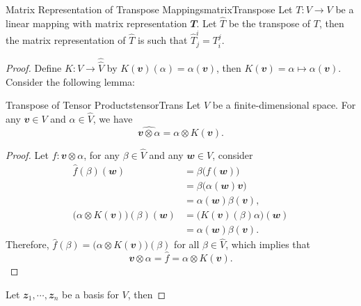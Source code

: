 \documentclass[math, code]{amznotes}
\theoremstyle{remark}
\begin{document}
\begin{probox}{Matrix Representation of Transpose Mappings}{matrixTranspose}
    Let $T \colon V \to V$ be a linear mapping with matrix representation $\mathbfit{T}$. Let $\widehat{T}$ be the transpose of $T$, then the matrix representation of $\widehat{T}$ is such that $\widehat{T}^{i}_j = T^j_i$.
    \tcblower
    \begin{proof}
        Define $K \colon V \to \widehat{\widehat{V}}$ by $K(\mathbfit{v})(\alpha) = \alpha(\mathbfit{v})$, then $K(\mathbfit{v}) = \alpha \mapsto \alpha(\mathbfit{v})$. Consider the following lemma:
        \begin{lembox}{Transpose of Tensor Products}{tensorTrans}
            Let $V$ be a finite-dimensional space. For any $\mathbfit{v} \in V$ and $\alpha \in \widehat{V}$, we have 
            \begin{equation*}
                \widehat{\mathbfit{v} \otimes \alpha} = \alpha \otimes K(\mathbfit{v}).
            \end{equation*}
            \tcblower
            \begin{proof}
                Let $f \colon \mathbfit{v} \otimes \alpha$, for any $\beta \in \widehat{V}$ and any $\mathbfit{w} \in V$, consider 
                \begin{align*}
                    \widehat{f}(\beta)(\mathbfit{w}) & = \beta\bigl(f(\mathbfit{w})\bigr) \\
                    & = \beta\bigl(\alpha(\mathbfit{w})\mathbfit{v}\bigr) \\
                    & = \alpha(\mathbfit{w})\beta(\mathbfit{v}), \\
                    \bigl(\alpha \otimes K(\mathbfit{v})\bigr)(\beta)(\mathbfit{w}) & = \bigl(K(\mathbfit{v})(\beta)\alpha\bigr)(\mathbfit{w}) \\
                    & = \alpha(\mathbfit{w})\beta(\mathbfit{v}).
                \end{align*}     
                Therefore, $\widehat{f}(\beta) =  \bigl(\alpha \otimes K(\mathbfit{v})\bigr)(\beta)$ for all $\beta \in \widehat{V}$, which implies that 
                \begin{equation*}
                    \mathbfit{v} \otimes \alpha = \widehat{f} = \alpha \otimes K(\mathbfit{v}).
                \end{equation*}
            \end{proof}
        \end{lembox}
        Let $\mathbfit{z}_1, \cdots, \mathbfit{z}_n$ be a basis for $V$, then 

\end{proof}
\end{probox}
\end{document}
